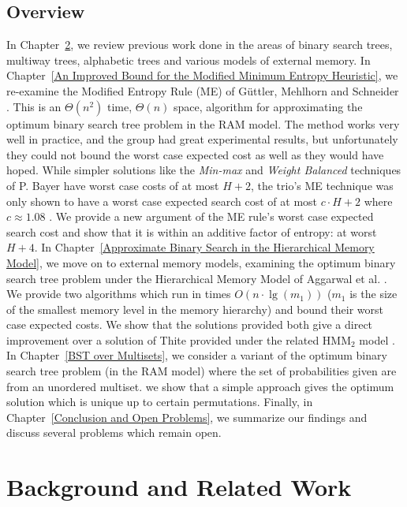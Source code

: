 \documentclass[letterpaper,12pt,titlepage,oneside,final]{book}
\theoremstyle{plain}
\begin{document}
\section{Overview}

In Chapter~\ref{Background and Related Work}, we review previous work done in the areas of binary search trees, multiway trees, alphabetic trees and various models of external memory. In Chapter~\ref{An Improved Bound for the Modified Minimum Entropy Heuristic}, we re-examine the Modified Entropy Rule (ME) of G{\"u}ttler, Mehlhorn and Schneider \cite{guttler1980binary}. This is an $\Theta(n^2)$ time, $\Theta(n)$ space, algorithm for approximating the optimum binary search tree problem in the RAM model. The method works very well in practice, and the group had great experimental results, but unfortunately they could not bound the worst case expected cost as well as they would have hoped. While simpler solutions like the \textit{Min-max} and \textit{Weight Balanced} techniques of P. Bayer have worst case costs of at most $H+2$, the trio's ME technique was only shown to have a worst case expected search cost of at most $c\cdot H+2$ where $c \approx 1.08$ \cite{bayer1975improved, guttler1980binary}. We provide a new argument of the ME rule's worst case expected search cost and show that it is within an additive factor of entropy: at worst $H+4$. In Chapter~\ref{Approximate Binary Search in the Hierarchical Memory Model}, we move on to external memory models, examining the optimum binary search tree problem under the Hierarchical Memory Model of Aggarwal et al. \cite{aggarwal1987model}. We provide two algorithms which run in times $O(n\cdot\lg(m_1))$ ($m_1$ is the size of the smallest memory level in the memory hierarchy) and bound their worst case expected costs. We show that the solutions provided both give a direct improvement over a solution of Thite provided under the related HMM$_2$ model \cite{thite2008optimum}. In Chapter~\ref{BST over Multisets}, we consider a variant of the optimum binary search tree problem (in the RAM model) where the set of probabilities given are from an unordered multiset. we show that a simple approach gives the optimum solution which is unique up to certain permutations. Finally, in Chapter~\ref{Conclusion and Open Problems}, we summarize our findings and discuss several problems which remain open.


\chapter{Background and Related Work} \label{Background and Related Work}
\end{document}
